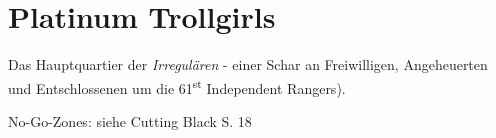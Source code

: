 \chapter{Platinum Trollgirls}

Das Hauptquartier der \emph{Irregulären} - einer Schar an Freiwilligen, Angeheuerten und Entschlossenen um die 61\textsuperscript{st} Independent Rangers).

No-Go-Zones: siehe Cutting Black S. 18